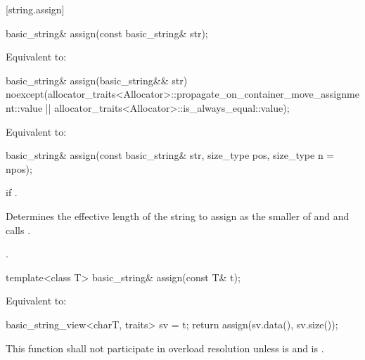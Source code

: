 [string.assign]{}

%
\begin{itemdecl}
basic_string& assign(const basic_string& str);
\end{itemdecl}

\begin{itemdescr}
\pnum
\effects Equivalent to: 
\end{itemdescr}

%
\begin{itemdecl}
basic_string& assign(basic_string&& str)
  noexcept(allocator_traits<Allocator>::propagate_on_container_move_assignment::value ||
           allocator_traits<Allocator>::is_always_equal::value);
\end{itemdecl}

\begin{itemdescr}
\pnum
\effects Equivalent to: 
\end{itemdescr}


%
\begin{itemdecl}
basic_string& assign(const basic_string& str, size_type pos, size_type n = npos);
\end{itemdecl}

\begin{itemdescr}
\pnum
\throws
{}
if
.

\pnum
\effects
Determines the effective length 
of the string to assign as the smaller of  and
 and calls
.

\pnum
\returns
{}.
\end{itemdescr}

%
\begin{itemdecl}
template<class T>
  basic_string& assign(const T& t);
\end{itemdecl}

\begin{itemdescr}
\pnum
\effects
Equivalent to:
\begin{codeblock}
{
  basic_string_view<charT, traits> sv = t;
  return assign(sv.data(), sv.size());
}
\end{codeblock}

\pnum
\remarks
This function shall not participate in overload resolution unless
 is  and
 is .
\end{itemdescr}

